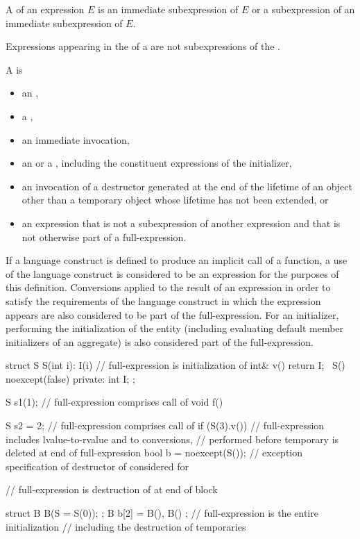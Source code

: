 \pnum
A  of an expression $E$ is
an immediate subexpression of $E$ or
a subexpression of an immediate subexpression of $E$.
\begin{note}
Expressions appearing in the  of a 
are not subexpressions of the .
\end{note}

\pnum
A  is
\begin{itemize}
\item
an ,
\item
a ,
\item
an immediate invocation,
\item
an  or
a ,
including the constituent expressions of the initializer,
\item
an invocation of a destructor generated at the end of the lifetime
of an object other than a temporary object
whose lifetime has not been extended, or
\item
an expression that is not a subexpression of another expression and
that is not otherwise part of a full-expression.
\end{itemize}
If a language construct is defined to produce an implicit call of a function,
a use of the language construct is considered to be an expression
for the purposes of this definition.
Conversions applied to the result of an expression in order to satisfy the requirements
of the language construct in which the expression appears
are also considered to be part of the full-expression.
For an initializer, performing the initialization of the entity
(including evaluating default member initializers of an aggregate)
is also considered part of the full-expression.
\begin{example}
\begin{codeblock}
struct S {
  S(int i): I(i) { }            // full-expression is initialization of 
  int& v() { return I; }
  ~S() noexcept(false) { }
private:
  int I;
};

S s1(1);                        // full-expression comprises call of 
void f() {
  S s2 = 2;                     // full-expression comprises call of 
  if (S(3).v())                 // full-expression includes lvalue-to-rvalue and  to  conversions,
                                // performed before temporary is deleted at end of full-expression
  { }
  bool b = noexcept(S());       // exception specification of destructor of  considered for 

  // full-expression is destruction of  at end of block
}
struct B {
  B(S = S(0));
};
B b[2] = { B(), B() };          // full-expression is the entire initialization
                                // including the destruction of temporaries
\end{codeblock}
\end{example}

